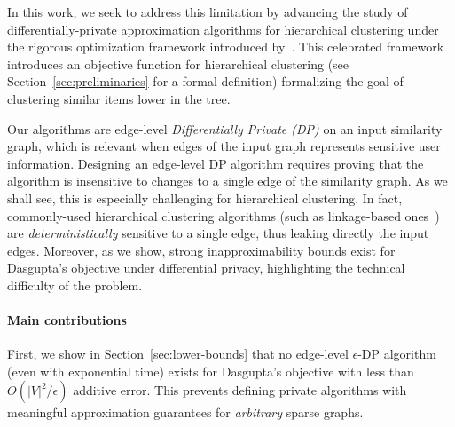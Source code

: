 In this work, we seek to address this limitation by advancing the study of differentially-private approximation algorithms for hierarchical clustering under the rigorous optimization framework introduced by~\citet{dasgupta2016cost}. This celebrated framework introduces an objective function for hierarchical clustering (see Section~\ref{sec:preliminaries} for a formal definition) formalizing the goal of clustering similar items lower in the tree. 



Our algorithms are edge-level {\em Differentially Private (DP)} on an input similarity graph, which is relevant when edges of the input graph represents sensitive user information.
Designing an edge-level DP algorithm requires proving that the algorithm is insensitive to changes to a single edge of the similarity graph. As we shall see, this is especially challenging for hierarchical clustering. In fact, commonly-used hierarchical clustering algorithms (such as linkage-based ones~\citep{J10}) are {\it deterministically} sensitive to a single edge, thus leaking directly the input edges. Moreover, as we show, strong inapproximability bounds exist for Dasgupta's objective under differential privacy, highlighting the technical difficulty of the problem.

\paragraph{Main contributions}
First, we show in Section~\ref{sec:lower-bounds} that no edge-level $\epsilon$-DP algorithm (even with exponential time) exists for Dasgupta's objective with less than $O(|V|^2/ \epsilon)$ additive error. This prevents defining private algorithms with meaningful approximation guarantees for {\it arbitrary} sparse graphs.

